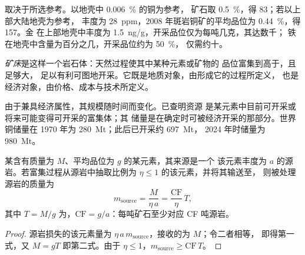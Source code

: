 取决于所选参考。以地壳中 \qty{0.006}{\percent} 的铜为参考，
矿石取 \qty{0.5}{\percent}，得 83；若以上部大陆地壳为参考，
丰度为 \qty{28}{ppm}，2008 年斑岩铜矿的平均品位为 \qty{0.44}{\percent}，得 157。金
在上部地壳中丰度为 \qty{1.5}{ng/g}，开采品位仅为每吨几克，其达数千；
铁在地壳中含量为百分之几，开采品位约为 \qty{50}{\percent}，
仅需约十。

\begin{definition}[矿床]\label{def:b2:ore-deposits:deposit}
\emph{矿床}是这样一个岩石体：天然过程使其中某种元素或矿物的
品位富集到高于，且足够大，
足以有利可图地开采。它既是地质对象，由形成它的过程所定义，
也是经济对象，由价格、成本与技术所定义。
\end{definition}

由于兼具经济属性，其规模随时间而变化。已查明资源
是某元素中目前可开采或将来可能变得可开采的富集体；其
储量是在确定时可被经济开采的那部分。世界
铜储量在 1970 年为 \qty{280}{Mt}；此后已开采约 \qty{697}{Mt}，
2024 年时储量为 \qty{980}{Mt}。

\begin{proposition}[矿床的质量平衡]\label{prop:b2:ore-deposits:mass-balance}
某含有质量为 $M$、平均品位为 $g$ 的某元素，其来源是一个
该元素丰度为 $a$ 的源岩。若富集过程从源岩中抽取比例为 $\eta \leq 1$ 的该元素，并将其输送至，
则被处理源岩的质量为
\begin{equation}
m_{\mathrm{source}} = \frac{M}{\eta\,a} = \frac{\mathrm{CF}}{\eta}\, T ,
\label{eq:b2:ore-deposits:mass-balance}
\end{equation}
其中 $T = M/g$ 为，$\mathrm{CF} = g/a$：每吨矿石至少对应 CF 吨源岩。
\end{proposition}

\begin{proof}
源岩损失的该元素量为 $\eta\,a\,m_{\mathrm{source}}$，接收的为 $M$；令二者相等，
即得第一式，又 $M = gT$ 即第二式。由于 $\eta \leq 1$，$m_{\mathrm{source}} \geq
\mathrm{CF}\,T$。
\end{proof}

